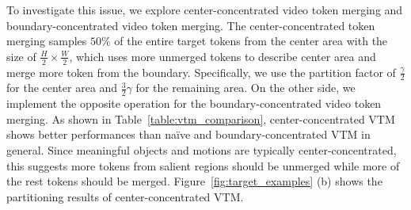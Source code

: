 \documentclass{article}
\begin{document}
To investigate this issue, we explore center-concentrated video token merging and boundary-concentrated video token merging. The center-concentrated token merging samples $50\%$ of the entire target tokens from the center area with the size of $\frac{H}{2} \times \frac{W}{2}$, which uses more unmerged tokens to describe center area and merge more token from the boundary. Specifically, we use the partition factor of $\frac{\gamma}{2}$ for the center area and $\frac{3}{2}\gamma$ for the remaining area. On the other side, we implement the opposite operation for the boundary-concentrated video token merging. As shown in Table~\ref{table:vtm_comparison}, center-concentrated VTM shows better performances than na\"ive and boundary-concentrated VTM in general. Since meaningful objects and motions are typically center-concentrated, this suggests more tokens from salient regions should be unmerged while more of the rest tokens should be merged. Figure~\ref{fig:target_examples} (b) shows the partitioning results of center-concentrated VTM.

\begin{table}[t]
    \caption
    {
        Comparison of different VTM methods on the LVU dataset. The best results are boldfaced and the second-best ones are underlined.
    }
    \centering
    \vspace*{-0.2cm}
   \label{table:vtm_comparison}
\end{table}
\end{document}
